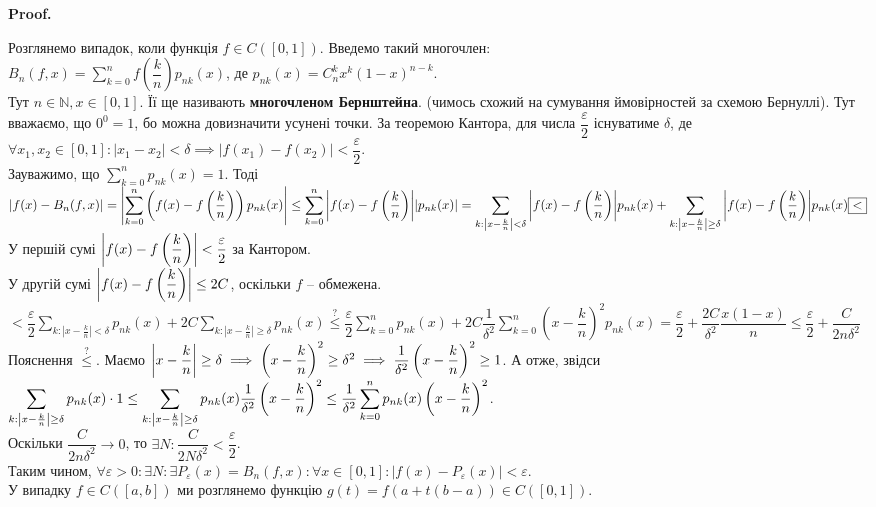 \documentclass[a4paper, 10pt]{article}
\makeatletter
\def\qed{$\blacksquare$}
\theoremstyle{theoremdd}
\theoremstyle{theoremdd}
\theoremstyle{theoremdd}
\theoremstyle{theoremdd}
\theoremstyle{theoremdd}
\theoremstyle{theoremdd}
\theoremstyle{theoremdd}
\theoremstyle{theoremdd}
\renewenvironment{proof}[1][Proof.\\]{\par
\pushQED{\hfill \qed}%
\normalfont \topsep6\p@\@plus6\p@\relax
\trivlist
\item\relax
{\bfseries
#1\@addpunct{.}}\hspace\labelsep\ignorespaces
}{%
\popQED\endtrivlist\@endpefalse
}
\makeatother
\begin{document}
\begin{proof}
Розглянемо випадок, коли функція $f \in C([0,1])$. Введемо такий многочлен:\\
$B_n(f,x) = \displaystyle\sum_{k=0}^n f \left( \dfrac{k}{n} \right) p_{nk}(x)$, де $p_{nk}(x) = C_n^k x^k (1-x)^{n-k}$.\\
Тут $n \in \mathbb{N}, x \in [0,1]$. Її ще називають \textbf{многочленом Бернштейна}. (чимось схожий на сумування ймовірностей за схемою Бернуллі). Тут вважаємо, що $0^0 = 1$, бо можна довизначити усунені точки. За теоремою Кантора, для числа $\dfrac{\varepsilon}{2}$ існуватиме $\delta$, де $\forall x_1,x_2 \in [0,1]: |x_1-x_2| < \delta \implies |f(x_1)-f(x_2)| < \dfrac{\varepsilon}{2}$.\\
Зауважимо, що $\displaystyle\sum_{k=0}^n p_{nk}(x) = 1$.
Тоді\\
$|f(x) - B_{n}(f,x)| = \displaystyle\abs{\sum_{k=0}^n \left( f(x) - f\left( \dfrac{k}{n} \right) \right) p_{nk}(x) } \leq \sum_{k=0}^n \abs{f(x) - f\left( \dfrac{k}{n} \right)} |p_{nk}(x)| \\
= \sum_{k: \left| x -\frac{k}{n} \right| < \delta} \abs{f(x) - f\left( \dfrac{k}{n} \right)} p_{nk}(x) + \sum_{k: \left| x -\frac{k}{n} \right| \geq \delta} \abs{f(x) - f\left( \dfrac{k}{n} \right)} p_{nk}(x) \boxed{<}$\\
У першій сумі $\abs{f(x) - f\left( \dfrac{k}{n} \right)} < \dfrac{\varepsilon}{2}$ за Кантором.\\
У другій сумі $\abs{f(x) - f\left( \dfrac{k}{n} \right)} \leq 2C$, оскільки $f$ -- обмежена.\\
$\boxed{<} \displaystyle \dfrac{\varepsilon}{2} \sum_{k: \left| x -\frac{k}{n} \right| < \delta} p_{nk}(x) + 2C \sum_{k: \left| x -\frac{k}{n} \right| \geq \delta} p_{nk}(x) \overset{?}{\leq} \dfrac{\varepsilon}{2} \sum_{k=0}^n p_{nk}(x) + 2C \dfrac{1}{\delta^2} \sum_{k=0}^n \left( x -\dfrac{k}{n} \right)^2 p_{nk}(x) = \dfrac{\varepsilon}{2} + \dfrac{2C}{\delta^2} \dfrac{x(1-x)}{n} \leq \dfrac{\varepsilon}{2} + \dfrac{C}{2n\delta^2}$\\
Пояснення $\overset{?}{\leq}$. Маємо $\abs{x - \dfrac{k}{n}} \geq \delta \implies \left( x - \dfrac{k}{n} \right)^2 \geq \delta^2 \implies \dfrac{1}{\delta^2} \left( x - \dfrac{k}{n} \right)^2 \geq 1$. А отже, звідси\\
$\displaystyle\sum_{k: \abs{x - \frac{k}{n}} \geq \delta} p_{nk}(x) \cdot 1 \leq \sum_{k: \abs{x - \frac{k}{n}} \geq \delta} p_{nk}(x) \dfrac{1}{\delta^2} \left( x - \dfrac{k}{n} \right)^2 \leq \dfrac{1}{\delta^2} \sum_{k=0}^n p_{nk}(x) \left( x - \dfrac{k}{n} \right)^2$.\\
Оскільки $\dfrac{C}{2n\delta^2} \to 0$, то $\exists N: \dfrac{C}{2N\delta^2} < \dfrac{\varepsilon}{2}$.\\
Таким чином, $\forall \varepsilon > 0: \exists N: \exists P_\varepsilon(x) = B_n(f,x): \forall x \in [0,1]: |f(x)- P_{\varepsilon}(x)| < \varepsilon$.
\bigskip \\
У випадку $f \in C([a,b])$ ми розглянемо функцію $g(t) = f(a+t(b-a)) \in C([0,1])$.
\end{proof}
\end{document}
